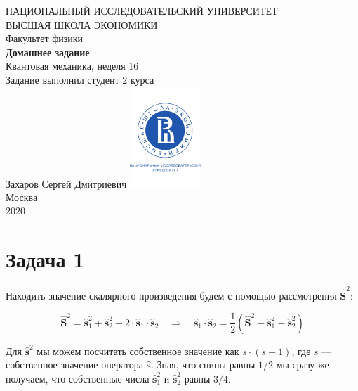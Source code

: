 \documentclass[a4paper, 12pt]{article}
\newcommand{\qrq}
{\ensuremath{\quad \Rightarrow \quad}} %
\begin{document}
	\begin{titlepage}
		\begin{center}
			$$$$
			$$$$
			$$$$
			$$$$
			{\Large{НАЦИОНАЛЬНЫЙ ИССЛЕДОВАТЕЛЬСКИЙ УНИВЕРСИТЕТ}}\\
			\vspace{0.1cm}
			{\Large{ВЫСШАЯ ШКОЛА ЭКОНОМИКИ}}\\
			\vspace{0.25cm}
			{\large{Факультет физики}}\\
			\vspace{5.5cm}
			{\Huge\textbf{{Домашнее задание}}}\\%
			\vspace{1cm}
			{\LARGE{Квантовая механика, неделя 16}}\\%
			\vspace{2cm}
			{Задание выполнил студент 2 курса}\\
			{Захаров Сергей Дмитриевич}
			\vfill
			\includegraphics[width = 0.2\textwidth]{HSElogo}\\
			\vfill
			Москва\\
			2020
		\end{center}
	\end{titlepage}

\section*{Задача 1}

Находить значение скалярного произведения будем с помощью рассмотрения $\hat{\mathbf{S}}^2$:

\begin{equation}
	\hat{\mathbf{S}}^2 = \hat{\mathbf{s}}_1^2 + \hat{\mathbf{s}}_2^2 + 2 \cdot  \hat{\mathbf{s}}_1 \cdot \hat{\mathbf{s}}_2 \qrq \hat{\mathbf{s}}_1 \cdot \hat{\mathbf{s}}_2 = \frac{1}{2} \left(\hat{\mathbf{S}}^2 - \hat{\mathbf{s}}_1^2 - \hat{\mathbf{s}}_2^2\right)
	\label{eq:t1_result}
\end{equation}

Для $\hat{\mathbf{s}}^2$ мы можем посчитать собственное значение как $s \cdot (s + 1)$, где $s$ --- собственное значение оператора $\hat{\mathbf{s}}$. Зная, что спины равны $1/2$  мы сразу же получаем, что собственные числа $\hat{\mathbf{s}}_1^2$ и $\hat{\mathbf{s}}_2^2$ равны $3/4$. 
\end{document}
